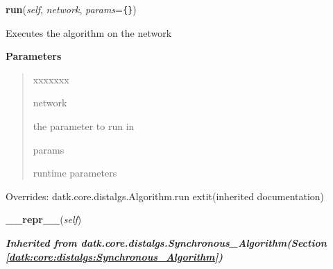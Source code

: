     \vspace{0.5ex}

\hspace{.8\funcindent}\begin{boxedminipage}{\funcwidth}

    \raggedright \textbf{run}(\textit{self}, \textit{network}, \textit{params}={\tt \texttt{\{}\texttt{\}}})

\setlength{\parskip}{2ex}
    Executes the algorithm on the network

\setlength{\parskip}{1ex}
      \textbf{Parameters}
      \vspace{-1ex}

      \begin{quote}
        \begin{Ventry}{xxxxxxx}

          \item[network]

          the parameter to run in

          \item[params]

          runtime parameters

        \end{Ventry}

      \end{quote}

      Overrides: datk.core.distalgs.Algorithm.run 	extit{(inherited documentation)}

    \end{boxedminipage}

    \label{datk:core:distalgs:Compose:__repr__}

    \vspace{0.5ex}

\hspace{.8\funcindent}\begin{boxedminipage}{\funcwidth}

    \raggedright \textbf{\_\_repr\_\_}(\textit{self})

\setlength{\parskip}{2ex}
\setlength{\parskip}{1ex}
    \end{boxedminipage}


\large{\textbf{\textit{Inherited from datk.core.distalgs.Synchronous\_Algorithm\textit{(Section \ref{datk:core:distalgs:Synchronous_Algorithm})}}}}

